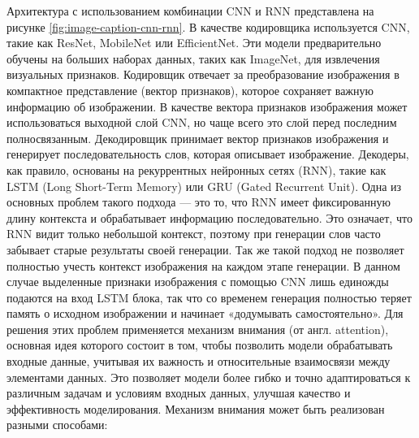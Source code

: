 \documentclass[a4paper,12pt]{extarticle}
\begin{document}
Архитектура с использованием комбинации CNN и RNN представлена на рисунке \ref{fig:image-caption-cnn-rnn}. В качестве кодировщика используется CNN, такие как ResNet, MobileNet или EfficientNet. Эти модели предварительно обучены на больших наборах данных, таких как ImageNet, для извлечения визуальных признаков. Кодировщик отвечает за преобразование изображения в компактное представление (вектор признаков), которое сохраняет важную информацию об изображении. В качестве вектора признаков изображения может использоваться выходной слой CNN, но чаще всего это слой перед последним полносвязанным. Декодировщик принимает вектор признаков изображения и генерирует последовательность слов, которая описывает изображение. Декодеры, как правило, основаны на рекуррентных нейронных сетях (RNN), такие как LSTM (Long Short-Term Memory) или GRU (Gated Recurrent Unit). Одна из основных проблем такого подхода — это то, что RNN имеет фиксированную длину контекста и обрабатывает информацию последовательно. Это означает, что RNN видит только небольшой контекст, поэтому при генерации слов часто забывает старые результаты своей генерации. Так же такой подход не позволяет полностью учесть контекст изображения на каждом этапе генерации. В данном случае выделенные признаки изображения с помощью CNN лишь единожды подаются на вход LSTM блока, так что со временем генерация полностью теряет память о исходном изображении и начинает «додумывать самостоятельно». Для решения этих проблем применяется механизм внимания (от англ. attention)\cite{attention}, основная идея которого состоит в том, чтобы позволить модели обрабатывать входные данные, учитывая их важность и относительные взаимосвязи между элементами данных. Это позволяет модели более гибко и точно адаптироваться к различным задачам и условиям входных данных, улучшая качество и эффективность моделирования. Механизм внимания может быть реализован разными способами:
\end{document}
